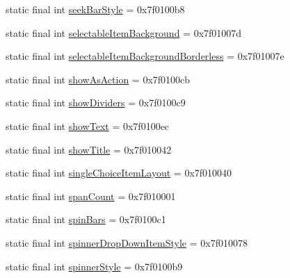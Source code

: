 \begin{CompactItemize}
\item 
static final int \hyperlink{classandroid_1_1support_1_1graphics_1_1drawable_1_1animated_1_1_r_1_1attr_69261a9374803164251186ccab487c91}{seekBarStyle} = 0x7f0100b8
\item 
static final int \hyperlink{classandroid_1_1support_1_1graphics_1_1drawable_1_1animated_1_1_r_1_1attr_4eadc3836cddcf7f414cbedd98fceb14}{selectableItemBackground} = 0x7f01007d
\item 
static final int \hyperlink{classandroid_1_1support_1_1graphics_1_1drawable_1_1animated_1_1_r_1_1attr_285c3e938938445a00bf9f341937b4a9}{selectableItemBackgroundBorderless} = 0x7f01007e
\item 
static final int \hyperlink{classandroid_1_1support_1_1graphics_1_1drawable_1_1animated_1_1_r_1_1attr_08125ad0d0bae12ac63c3aee75c2a69d}{showAsAction} = 0x7f0100cb
\item 
static final int \hyperlink{classandroid_1_1support_1_1graphics_1_1drawable_1_1animated_1_1_r_1_1attr_d1adc7bc1e7c3d073f137c8b26c00fe0}{showDividers} = 0x7f0100c9
\item 
static final int \hyperlink{classandroid_1_1support_1_1graphics_1_1drawable_1_1animated_1_1_r_1_1attr_8b8509abbe0f05fa74aa99fde19dc4e8}{showText} = 0x7f0100ec
\item 
static final int \hyperlink{classandroid_1_1support_1_1graphics_1_1drawable_1_1animated_1_1_r_1_1attr_1884c2797ff15ab217062a3e4397227e}{showTitle} = 0x7f010042
\item 
static final int \hyperlink{classandroid_1_1support_1_1graphics_1_1drawable_1_1animated_1_1_r_1_1attr_cd99505e2cb862699235698aa8646a90}{singleChoiceItemLayout} = 0x7f010040
\item 
static final int \hyperlink{classandroid_1_1support_1_1graphics_1_1drawable_1_1animated_1_1_r_1_1attr_ba1972e582a3846f086ced1bb27e400f}{spanCount} = 0x7f010001
\item 
static final int \hyperlink{classandroid_1_1support_1_1graphics_1_1drawable_1_1animated_1_1_r_1_1attr_2ae02a4981aab4d3c390f43daa5524af}{spinBars} = 0x7f0100c1
\item 
static final int \hyperlink{classandroid_1_1support_1_1graphics_1_1drawable_1_1animated_1_1_r_1_1attr_07b84ee6a565c5e24f74f6b6052492a1}{spinnerDropDownItemStyle} = 0x7f010078
\item 
static final int \hyperlink{classandroid_1_1support_1_1graphics_1_1drawable_1_1animated_1_1_r_1_1attr_8b25c722707365ff5121f654c28f5929}{spinnerStyle} = 0x7f0100b9
\item 

\end{CompactItemize}
